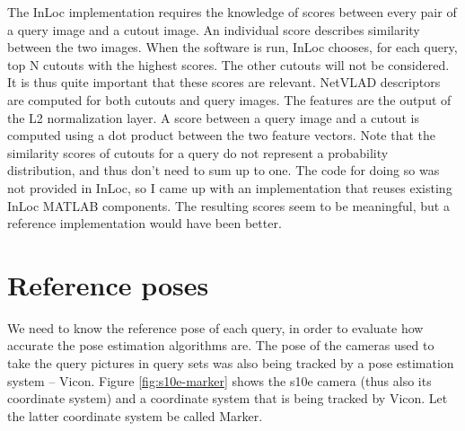 \documentclass[twoside]{ctuthesis}
\theoremstyle{plain}
\theoremstyle{definition}
\theoremstyle{note}
\begin{document}
The InLoc implementation requires the knowledge of scores between every pair of a query image and a cutout image. An individual score describes similarity between the two images. When the software is run, InLoc chooses, for each query, top N cutouts with the highest scores. The other cutouts will not be considered. It is thus quite important that these scores are relevant. NetVLAD \cite{Arandjelovic16} descriptors are computed for both cutouts and query images. The features are the output of the L2 normalization layer. A score between a query image and a cutout is computed using a dot product between the two feature vectors. Note that the similarity scores of cutouts for a query do not represent a probability distribution, and thus don't need to sum up to one. The code for doing so was not provided in InLoc, so I came up with an implementation that reuses existing InLoc MATLAB components. The resulting scores seem to be meaningful, but a reference implementation would have been better.

\section{Reference poses}
\label{section:reference-poses}
We need to know the reference pose of each query, in order to evaluate how accurate the pose estimation algorithms are. The pose of the cameras used to take the query pictures in query sets was also being tracked by a pose estimation system -- Vicon. Figure \ref{fig:s10e-marker} shows the s10e camera (thus also its coordinate system) and a coordinate system that is being tracked by Vicon. Let the latter coordinate system be called Marker. 
\end{document}

